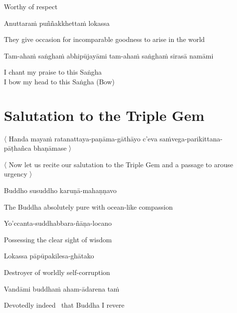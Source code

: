 \begin{english}
  Worthy of respect
\end{english}

Anuttaraṁ puññakkhettaṁ lokassa

\begin{english}
  They give occasion for incomparable goodness to arise in the world
\end{english}

\begin{pali-hang}
  Tam-ahaṁ saṅghaṁ abhipūjayāmi tam-ahaṁ saṅghaṁ sirasā namāmi
\end{pali-hang}

\begin{english}
  I chant my praise to this Saṅgha\\
  I bow my head to this Saṅgha \hfill{(Bow)}
\end{english}

\section{Salutation to the Triple Gem}
\label{salutation}

\begin{leader}
  〈 Handa mayaṁ ratanattaya-paṇāma-gāthāyo c'eva saṁvega-parikittana-pāṭhañca bhaṇāmase 〉
\end{leader}
\begin{leader-english}
  〈 Now let us recite our salutation to the Triple Gem and a passage to arouse urgency 〉
\end{leader-english}

Buddho susuddho karuṇā-mahaṇṇavo

\begin{english}
  The Buddha absolutely pure with ocean-like compassion
\end{english}

Yo'ccanta-suddhabbara-ñāṇa-locano

\begin{english}
  Possessing the clear sight of wisdom
\end{english}

Lokassa pāpūpakilesa-ghātako

\begin{english}
  Destroyer of worldly self-corruption
\end{english}

Vandāmi buddhaṁ aham-ādarena taṁ

\begin{english}
  Devotedly indeed \breathmark\ that Buddha I revere
\end{english}


